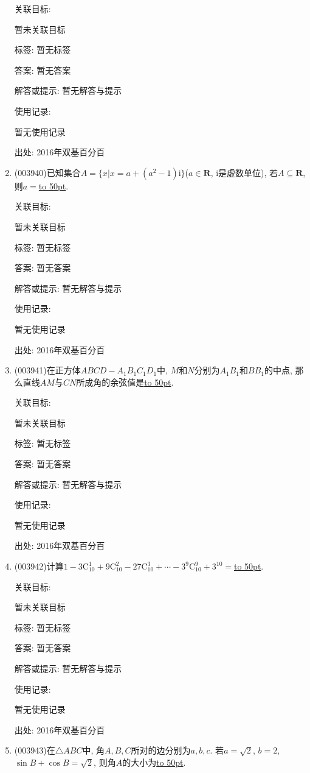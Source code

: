 \documentclass[10pt,a4paper]{article}
\newcommand{\blank}[1]{\underline{\hbox to #1pt{}}}
\begin{document}
\begin{enumerate}[1.]
关联目标:

暂未关联目标



标签: 暂无标签

答案: 暂无答案

解答或提示: 暂无解答与提示

使用记录:

暂无使用记录


出处: 2016年双基百分百
\item { (003940)}已知集合$A=\{x|x=a+(a^2-1)\mathrm{i}\}$($a\in \mathbf{R}$, $\mathrm{i}$是虚数单位), 若$A\subseteq \mathbf{R}$, 则$a=$\blank{50}.


关联目标:

暂未关联目标



标签: 暂无标签

答案: 暂无答案

解答或提示: 暂无解答与提示

使用记录:

暂无使用记录


出处: 2016年双基百分百
\item { (003941)}在正方体$ABCD-A_1B_1C_1D_1$中, $M$和$N$分别为$A_1B_1$和$BB_1$的中点, 那么直线$AM$与$CN$所成角的余弦值是\blank{50}.


关联目标:

暂未关联目标



标签: 暂无标签

答案: 暂无答案

解答或提示: 暂无解答与提示

使用记录:

暂无使用记录


出处: 2016年双基百分百
\item { (003942)}计算$1-3\mathrm{C}_{10}^1+9\mathrm{C}_{10}^2-27\mathrm{C}_{10}^3+\cdots-3^9\mathrm{C}_{10}^9+3^{10}=$\blank{50}.


关联目标:

暂未关联目标



标签: 暂无标签

答案: 暂无答案

解答或提示: 暂无解答与提示

使用记录:

暂无使用记录


出处: 2016年双基百分百
\item { (003943)}在$\triangle ABC$中, 角$A,B,C$所对的边分别为$a,b,c$. 若$a=\sqrt{2}$, $b=2$, $\sin B+\cos B=\sqrt{2}$, 则角$A$的大小为\blank{50}.



\end{enumerate}
\end{document}
